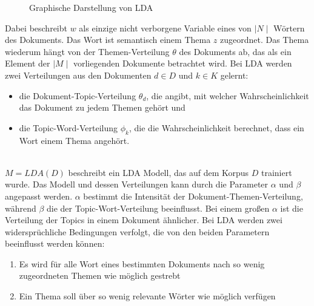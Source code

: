 \documentclass[german,version-2020-11]{uzl-thesis}
\begin{document}
\begin{figure}[h]
\centering
{}\caption{Graphische Darstellung von LDA}
\label{fig:ldagraphic}
\end{figure}

Dabei beschreibt $w$ als einzige nicht verborgene Variable eines von $\mid N \mid$ Wörtern des Dokuments. Das Wort ist semantisch einem Thema $z$ zugeordnet. Das Thema wiederum hängt von der Themen-Verteilung $\theta$ des Dokuments ab, das als ein Element der $\mid M \mid$ vorliegenden Dokumente betrachtet wird. Bei LDA werden zwei Verteilungen aus den Dokumenten $d \in D$ und $k \in K$ gelernt: 

\begin{itemize}
\item die Dokument-Topic-Verteilung $\theta_d$, die angibt, mit welcher Wahrscheinlichkeit das Dokument zu jedem Themen gehört und 
\item die Topic-Word-Verteilung $\phi_k$, die die Wahrscheinlichkeit berechnet, dass ein Wort einem Thema angehört. 
\end{itemize}\\

$M = LDA(D)$ beschreibt ein LDA Modell, das auf dem Korpus $D$ trainiert wurde. Das Modell und dessen Verteilungen kann durch die Parameter $\alpha$ und $\beta$ angepasst werden. $\alpha$ bestimmt die Intensität der Dokument-Themen-Verteilung, während $\beta$ die der Topic-Wort-Verteilung beeinflusst. Bei einem großen $\alpha$ ist die Verteilung der Topics in einem Dokument ähnlicher. Bei LDA werden zwei widersprüchliche Bedingungen verfolgt, die von den beiden Parametern beeinflusst werden können:
\begin{enumerate}
\item Es wird für alle Wort eines bestimmten Dokuments nach so wenig zugeordneten Themen wie möglich gestrebt
\item Ein Thema soll über so wenig relevante Wörter wie möglich verfügen
\end{enumerate}\\
\end{document}

